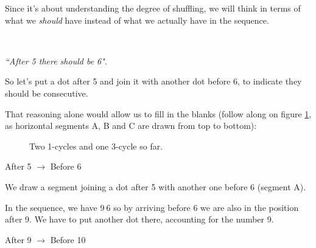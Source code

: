 \documentclass[11pt,final,twoside,nofrench]{thlifl}
\begin{document}
Since it's about understanding the degree of shuffling, we will think in terms of what we \emph{should} have instead of what we actually have in the sequence.

~

\emph{``After 5 there should be 6"}.

So let's put a dot after 5 and join it with another dot before 6, to indicate they should be consecutive.

That reasoning alone would allow us to fill in the blanks (follow along on figure \ref{fig:3cycle}, as horizontal segments A, B and C are drawn from top to bottom):

\begin{figure}[h!]
    \centering
    

\caption{Two 1-cycles and one 3-cycle so far.}
\label{fig:3cycle}
\end{figure}

After 5 $\rightarrow$ Before 6

We draw a segment joining a dot after 5 with another one before 6 (segment A).

In the sequence, we have $9 ~ 6$ so by arriving before 6 we are also in the position after 9. We have to put another dot there, accounting for the number 9.

After 9 $\rightarrow$ Before 10
\end{document}
